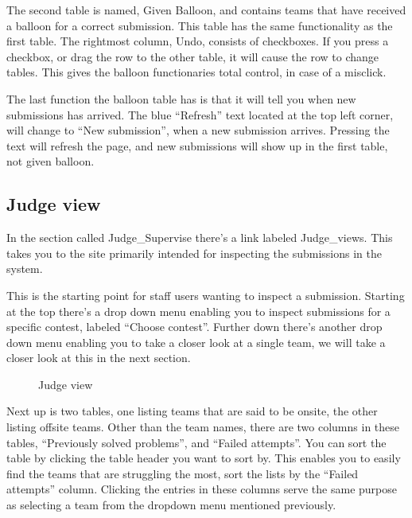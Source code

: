 The second table is named, Given Balloon, and contains teams that have
received a balloon for a correct submission. This table has the same
functionality as the first table. The rightmost column, Undo, consists
of checkboxes. If you press a checkbox, or drag the row to the other
table, it will cause the row to change tables. This gives the balloon
functionaries total control, in case of a misclick.


The last function the balloon table has is that it will tell you when
new submissions has arrived. The blue
{\textquotedblleft}Refresh{\textquotedblright} text located at the top
left corner, will change to {\textquotedblleft}New
submission{\textquotedblright}, when a new submission arrives. Pressing
the text will refresh the page, and new submissions will show up in the
first table, not given balloon. 


\subsection{Judge view}

In the section called Judge\_Supervise there{\textquoteright}s a link
labeled Judge\_views. This takes you to the site primarily intended for
inspecting the submissions in the system. 

This is the starting point for staff users wanting to inspect a
submission. Starting at the top there{\textquoteright}s a drop down
menu enabling you to inspect submissions for a specific contest,
labeled {\textquotedblleft}Choose contest{\textquotedblright}. Further
down there{\textquoteright}s another drop down menu enabling you to
take a closer look at a single team, we will take a closer look at this
in the next section. 

\begin{figure}
\centering
	\caption{Judge view}
	\label{fig:judgeView}
\end{figure}

\bigskip

Next up is two tables, one listing teams that are said to be onsite, the
other listing offsite teams. Other than the team names, there are two
columns in these tables, {\textquotedblleft}Previously solved
problems{\textquotedblright}, and {\textquotedblleft}Failed
attempts{\textquotedblright}. You can sort the table by clicking the
table header you want to sort by. This enables you to easily find the
teams that are struggling the most, sort the lists by the
{\textquotedblleft}Failed attempts{\textquotedblright} column. Clicking
the entries in these columns serve the same purpose as selecting a team
from the dropdown menu mentioned previously. 


